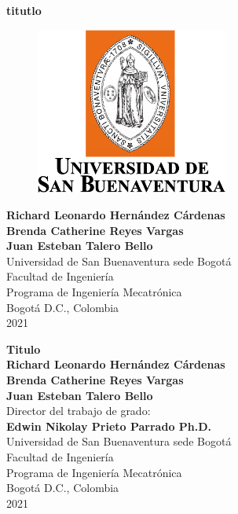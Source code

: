 \cleardoublepage

\thispagestyle{empty} 
\begin{center}
\textbf{ 
\huge{titutlo  }}\\[1.0cm]


\begin{figure}[htbp]
	\centering
		\includegraphics[height=5.5cm,keepaspectratio]{OtrosTex/LogoUSB}
\end{figure}


\vspace*{2.5cm} 
\Large\textbf{Richard Leonardo Hernández Cárdenas \\ Brenda Catherine Reyes Vargas\\Juan Esteban Talero Bello}\\[1.0cm]

\vspace*{2.5cm} 
\Large{Universidad de San Buenaventura sede Bogotá}\\
\Large{Facultad de Ingeniería}\\
\Large{Programa de Ingeniería Mecatrónica}\\
\large{Bogotá D.C., Colombia\\
2021}\\
\end{center}

\newpage{\pagestyle{empty}\cleardoublepage}
\newpage
\begin{center}
\thispagestyle{empty} \vspace*{0cm} \textbf{\huge
Titulo }\\[2.5cm]
\vspace*{1cm}
\Large\textbf{Richard Leonardo Hernández Cárdenas \\ Brenda Catherine Reyes Vargas\\Juan Esteban Talero Bello}\\[1.0cm]
\large{Director del trabajo de grado:}\\%
\large\textbf{Edwin Nikolay Prieto Parrado Ph.D.}\\[1.5cm]



\vspace*{2.5cm}
\Large{Universidad de San Buenaventura sede Bogotá}\\
\Large{Facultad de Ingeniería}\\
\Large{Programa de Ingeniería Mecatrónica}\\
\large{Bogotá D.C., Colombia\\
2021}\\
\end{center}


%
